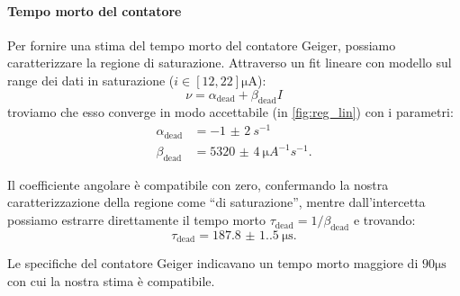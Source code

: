 \paragraph{Tempo morto del contatore}

Per fornire una stima del tempo morto del contatore Geiger, possiamo caratterizzare la regione di saturazione.
Attraverso un fit lineare con modello sul range dei dati in saturazione ($i \in [12,22] \unit{\micro\ampere}$): 
\begin{equation}
\nu = \alpha_\text{dead} + \beta_\text{dead} I
\end{equation}
troviamo che esso converge in modo accettabile (in \ref{fig:reg_lin}) con i parametri:
\begin{align}
\alpha_\text{dead} &= \SI{-1(2)}{\unit{s^{-1}}} \\
\beta_\text{dead} &= \SI{5320(4)}{\micro A^{-1} s^{-1}}.
\end{align}

Il coefficiente angolare è compatibile con zero, confermando la nostra caratterizzazione della regione come ``di saturazione'', mentre dall'intercetta possiamo estrarre direttamente il tempo morto $\tau_\text{dead} = 1/ \beta_\text{dead}$ e trovando:
\begin{equation}
\tau_\text{dead} = \SI{187.8(1.5)}{\micro \second}.
\end{equation}

Le specifiche del contatore Geiger indicavano un tempo morto maggiore di $90 \unit{\micro \second}$ con cui la nostra stima è compatibile.
